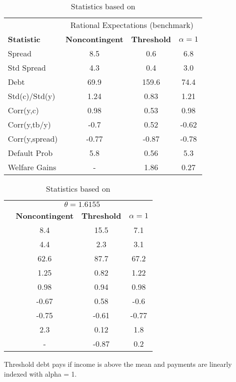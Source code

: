 \begin{table}[!hbtp]\centering\small 
\caption{Statistics based on \citet{Chatty}} \label{table:CE}
\begin{tabular}{@{}lccc@{}}\toprule
  & \multicolumn{3}{c}{Rational Expectations (benchmark)} \\\cmidrule{2-4}
\textbf{Statistic} & \textbf{Noncontingent} & \textbf{Threshold} & $\alpha = 1$\\\midrule
Spread                   & 8.5            & 0.6            & 6.8            \\
Std Spread               & 4.3            & 0.4            & 3.0            \\
Debt                     & 69.9           & 159.6           & 74.4           \\
Std(c)/Std(y)            & 1.24            & 0.83           & 1.21           \\
Corr(y,c)                & 0.98           & 0.53           & 0.98           \\
Corr(y,tb/y)             & -0.7          & 0.52           & -0.62          \\
Corr(y,spread)           & -0.77        & -0.87           & -0.78          \\
Default Prob             & 5.8            & 0.56            & 5.3            \\
Welfare Gains            & -              & 1.86           & 0.27           \\
  \bottomrule
\end{tabular}%
\begin{tabular}{@{}lccc@{}}\toprule
  & \multicolumn{3}{c}{$\theta = 1.6155$} \\\cmidrule{2-4}
  & \textbf{Noncontingent} & \textbf{Threshold} & $\alpha = 1$ \\\midrule
& 8.4            & 15.5           & 7.1            \\
& 4.4            & 2.3            & 3.1            \\
& 62.6           & 87.7           & 67.2           \\
& 1.25           & 0.82           & 1.22           \\
& 0.98           & 0.94           & 0.98           \\
& -0.67          & 0.58           & -0.6          \\
& -0.75          & -0.61          & -0.77           \\
& 2.3            & 0.12            & 1.8            \\
& -              & -0.87          & 0.2           \\
  \bottomrule 
\end{tabular}
\begin{tablenotes1}
  Threshold debt pays if income is above the mean and payments are linearly indexed with alpha = 1.
\end{tablenotes1}
\end{table}
 
